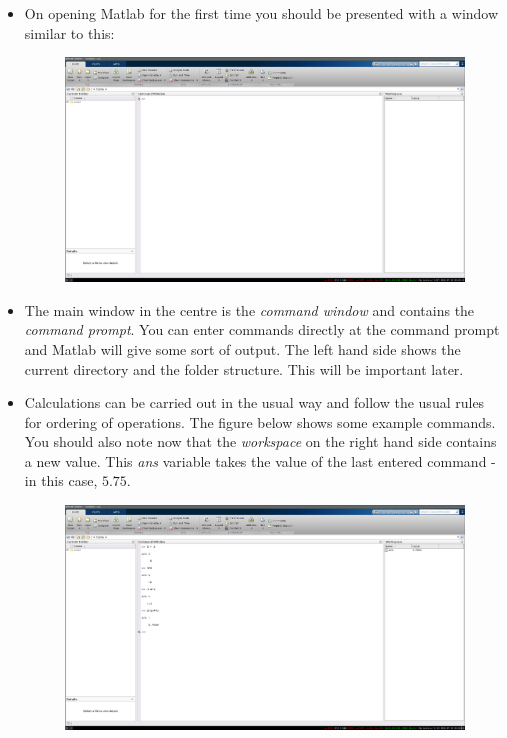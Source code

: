 \documentclass[12pt]{report}
\begin{document}
\begin{itemize}
\item On opening Matlab for the first time you should be presented with a window similar to this:
\begin{figure}[h]		
	\centering
	\includegraphics[width=1\textwidth]{matlab.png} 
    \caption*{}
\end{figure}
\item The main window in the centre is the \textit{command window} and contains the \textit{command prompt}. You can enter commands directly at the command prompt and Matlab will give some sort of output. The left hand side shows the current directory and the folder structure. This will be important later.
\item Calculations can be carried out in the usual way and follow the usual rules for ordering of operations. The figure below shows some example commands. You should also note now that the \textit{workspace} on the right hand side contains a new value. This \textit{ans} variable takes the value of the last entered command - in this case, $5.75$.
\begin{figure}[h]		
	\centering
	\includegraphics[width=1\textwidth]{matlabcalc.png} 

\end{figure}
\end{itemize}
\end{document}
